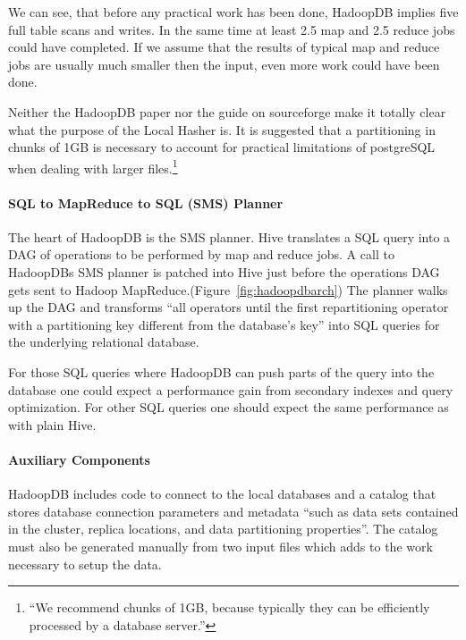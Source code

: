 \documentclass[12pt,a4paper]{scrartcl}		%
\begin{document}
We can see, that before any practical work has been done, HadoopDB implies five full table scans and writes. In the same time at least 2.5 map and 2.5 reduce jobs could have completed. If we assume that the results of typical map and reduce jobs are usually much smaller then the input, even more work could have been done.

Neither the HadoopDB paper nor the guide on sourceforge make it totally clear what the purpose of the Local Hasher is. It is suggested that a partitioning in chunks of 1GB is necessary to account for practical limitations of postgreSQL when dealing with larger files.\footnote{``We recommend chunks of 1GB, because typically they can be efficiently processed by a database server.''}

\paragraph{SQL to MapReduce to SQL (SMS) Planner}
The heart of HadoopDB is the SMS planner. Hive translates a SQL query into a DAG of operations to be performed by map and reduce jobs. A call to HadoopDBs SMS planner is patched into Hive just before the operations DAG gets sent to Hadoop MapReduce.(Figure~\ref{fig:hadoopdbarch}) The planner walks up the DAG and transforms ``all operators until the first repartitioning operator with a partitioning key different from the database's key'' into SQL queries for the underlying relational database. 

For those SQL queries where HadoopDB can push parts of the query into the database one could expect a performance gain from secondary indexes and query optimization. For other SQL queries one should expect the same performance as with plain Hive.

\paragraph{Auxiliary Components}
HadoopDB includes code to connect to the local databases and a catalog that stores database connection parameters and metadata ``such as data sets contained in the cluster, replica locations, and data partitioning properties''. The catalog must also be generated manually from two input files which adds to the work necessary to setup the data.
\end{document}
